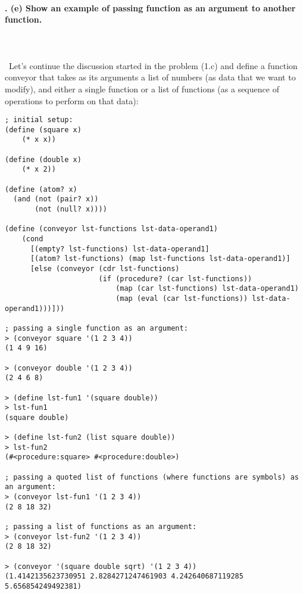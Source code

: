 \documentclass{article}
\begin{document}
\paragraph{}\
\paragraph{. (e) Show an example of passing function as an argument to another function.}\
\paragraph{}\
Let's continue the discussion started in the problem (1.c) and define a function conveyor that takes as its arguments a list of numbers (as data that we want to modify), and either a single function or a list of functions (as a sequence of operations to perform on that data):
\begin{verbatim} 
; initial setup:
(define (square x)
    (* x x))

(define (double x)
    (* x 2))
    
(define (atom? x)
  (and (not (pair? x))
       (not (null? x))))    
    
(define (conveyor lst-functions lst-data-operand1)
    (cond
      [(empty? lst-functions) lst-data-operand1]
      [(atom? lst-functions) (map lst-functions lst-data-operand1)]
      [else (conveyor (cdr lst-functions)
                      (if (procedure? (car lst-functions))
                          (map (car lst-functions) lst-data-operand1)
                          (map (eval (car lst-functions)) lst-data-operand1)))]))

; passing a single function as an argument:                          
> (conveyor square '(1 2 3 4))
(1 4 9 16)

> (conveyor double '(1 2 3 4))
(2 4 6 8)

> (define lst-fun1 '(square double))
> lst-fun1
(square double)

> (define lst-fun2 (list square double))
> lst-fun2
(#<procedure:square> #<procedure:double>)

; passing a quoted list of functions (where functions are symbols) as an argument:
> (conveyor lst-fun1 '(1 2 3 4))
(2 8 18 32)

; passing a list of functions as an argument:
> (conveyor lst-fun2 '(1 2 3 4))
(2 8 18 32)

> (conveyor '(square double sqrt) '(1 2 3 4))
(1.4142135623730951 2.8284271247461903 4.242640687119285 5.656854249492381)
\end{verbatim}
\end{document}
